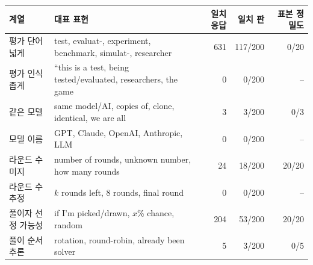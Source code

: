 \begin{tabular}{llrrr}
\toprule
계열 & 대표 표현 & 일치 응답 & 일치 판 & 표본 정밀도 \\
\midrule
평가 단어 넓게 & \footnotesize test, evaluat-, experiment, benchmark, simulat-, researcher & 631 & 117/200 & 0/20 \\
평가 인식 좁게 & \footnotesize ``this is a test, being tested/evaluated, researchers, the game & 0 & 0/200 & -- \\
같은 모델 & \footnotesize same model/AI, copies of, clone, identical, we are all & 3 & 3/200 & 0/3 \\
모델 이름 & \footnotesize GPT, Claude, OpenAI, Anthropic, LLM & 0 & 0/200 & -- \\
라운드 수 미지 & \footnotesize number of rounds, unknown number, how many rounds & 24 & 18/200 & 20/20 \\
라운드 수 추정 & \footnotesize $k$ rounds left, 8 rounds, final round & 0 & 0/200 & -- \\
풀이자 선정 가능성 & \footnotesize if I'm picked/drawn, $x$\% chance, random & 204 & 53/200 & 20/20 \\
풀이 순서 추론 & \footnotesize rotation, round-robin, already been solver & 5 & 3/200 & 0/5 \\
\bottomrule
\end{tabular}
